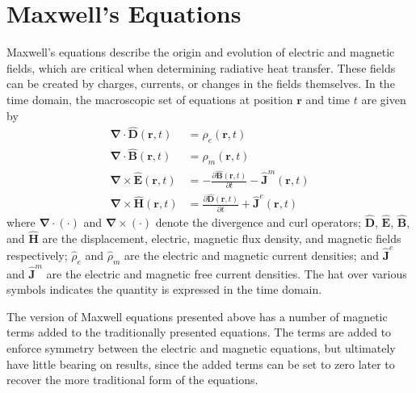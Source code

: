 \section{Maxwell's Equations} \label{sec:MaxwellEquations}
%
Maxwell's equations describe the origin and evolution of electric and magnetic fields, which are critical when determining radiative heat transfer. These fields can be created by charges, currents, or changes in the fields themselves. In the time domain, the macroscopic set of equations at position $\boldsymbol{r}$ and time $t$ are given by
\begin{subequations}
\begin{align}
\boldsymbol{\nabla} \cdot \widehat{\boldsymbol{D}}(\boldsymbol{r}, t) &= \widehat{\rho}_e(\boldsymbol{r}, t) \label{eq:ElectricDivergence}
\\
\boldsymbol{\nabla} \cdot \widehat{\boldsymbol{B}}(\boldsymbol{r}, t) &= \widehat{\rho}_m(\boldsymbol{r}, t) \label{eq:MagneticDivergence}
\\
\boldsymbol{\nabla} \times \widehat{\boldsymbol{E}}(\boldsymbol{r}, t) &= - \frac{\partial \widehat{\boldsymbol{B}}(\boldsymbol{r}, t)}{\partial t} - \widehat{\boldsymbol{J}}^m(\boldsymbol{r}, t) \label{eq:MaxwellCurlElectric1}
\\
\boldsymbol{\nabla} \times \widehat{\boldsymbol{H}}(\boldsymbol{r}, t) &= \frac{\partial \widehat{\boldsymbol{D}}(\boldsymbol{r}, t)}{\partial t} + \widehat{\boldsymbol{J}}^e(\boldsymbol{r}, t) \label{eq:MaxwellCurlMagnetic1}
\end{align}
\end{subequations}
%
where $\boldsymbol{\nabla} \cdot \left( \cdot \right)$ and $\boldsymbol{\nabla} \times \left( \cdot \right)$ denote the divergence and curl operators; $\widehat{\boldsymbol{D}}$, $\widehat{\boldsymbol{E}}$, $\widehat{\boldsymbol{B}}$, and $\widehat{\boldsymbol{H}}$ are the displacement, electric, magnetic flux density, and magnetic fields respectively; $\widehat{\rho}_e$ and $\widehat{\rho}_m$ are the electric and magnetic current densities; and $\widehat{\boldsymbol{J}}^e$ and $\widehat{\boldsymbol{J}}^m$ are the electric and magnetic free current densities. The hat over various symbols indicates the quantity is expressed in the time domain.

The version of Maxwell equations presented above has a number of magnetic terms added to the traditionally presented equations.\cite{Jackson1998} The terms are added to enforce symmetry between the electric and magnetic equations, but ultimately have little bearing on results, since the added terms can be set to zero later to recover the more traditional form of the equations. 

